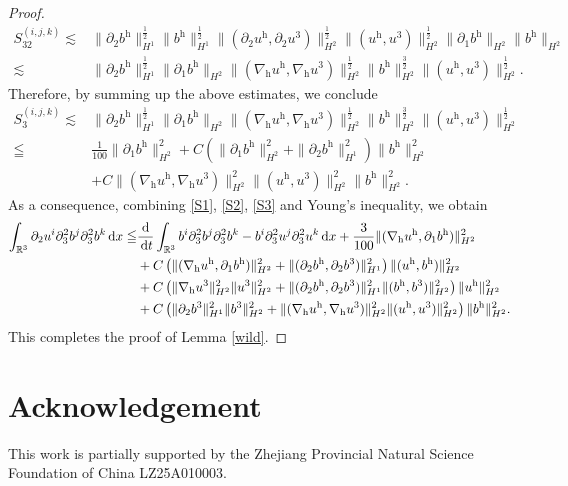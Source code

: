 \documentclass[11pt]{amsart}
\theoremstyle{definition}
\newcommand{\R}{\mathbb{R}}
\newcommand{\h}{\mathrm{h}}
\newcommand{\dx}{\,{\rm d}x}
\newcommand{\dt}{\,{\rm d}t}
\newcommand{\nablah}{\nabla_{\mathrm{h}}}
\numberwithin{equation}{section}
\begin{document}
\begin{proof}
	\begin{align*}
		S^{(i,j,k)}_{32}\lesssim&\|\partial_2b^\h\|_{H^1}^\frac12\|b^\h\|_{H^1}^\frac12\|(\partial_2u^\h,\partial_2u^3)\|_{H^2}^\frac12\|(u^\h,u^3)\|_{H^2}^\frac12\|\partial_1b^\h\|_{H^2}\|b^\h\|_{H^2}\\
		\lesssim&\|\partial_2b^\h\|_{H^1}^\frac12\|\partial_1b^\h\|_{H^2}\|(\nablah u^\h,\nablah u^3)\|_{H^2}^\frac12\|b^\h\|_{H^2}^\frac32\|(u^\h,u^3)\|_{H^2}^\frac12.
	\end{align*}
	Therefore, by summing up the above estimates, we conclude
	\begin{align}\label{S3}
		S^{(i,j,k)}_{3}\lesssim&\|\partial_2b^\h\|_{H^1}^\frac12\|\partial_1b^\h\|_{H^2}\|(\nablah u^\h,\nablah u^3)\|_{H^2}^\frac12\|b^\h\|_{H^2}^\frac32\|(u^\h,u^3)\|_{H^2}^\frac12\nonumber\\
		\leqq &\frac{1}{100}\|\partial_1b^\h\|_{H^2}^2+C\left(\|\partial_1b^\h\|_{H^2}^2+\|\partial_2b^\h\|_{H^1}^2\right)\|b^\h\|_{H^2}^2\nonumber\\
		&+C\|(\nablah u^\h,\nablah u^3)\|_{H^2}^2\|(u^\h,u^3)\|_{H^2}^2\|b^\h\|_{H^2}^2.
	\end{align}
	As a consequence, combining \eqref{S1}, \eqref{S2}, \eqref{S3} and Young's inequality, we obtain
	\begin{align*}
		\int_{\R^3}\partial_2u^i\partial_3^2b^j\partial_3^2b^k\dx \leqq&\frac{\mathrm{d}}{\dt}\int_{\R^3} b^i\partial_3^2b^j\partial_3^2b^k-b^i\partial_3^2u^j\partial_3^2u^k\dx+\frac{3}{100}\|(\nablah u^\h,\partial_1b^\h)\|_{H^2}^2\nonumber\\
		&+C\left(\|(\nablah u^\h,\partial_1b^\h)\|_{H^2}^2+\|(\partial_2b^\h,\partial_2b^3)\|_{H^1}^2\right)\|(u^\h,b^\h)\|_{H^2}^2\nonumber\\
		&+C\left(\|\nablah u^3\|_{H^2}^2\|u^3\|_{H^2}^2+ \|(\partial_2b^\h,\partial_2b^3)\|_{H^1}^2\|(b^\h,b^3)\|_{H^2}^2\right)\|u^\h\|_{H^2}^2\\	&+C\left(\|\partial_2b^3\|_{H^1}^2\|b^3\|_{H^2}^2+\|(\nablah u^\h,\nablah u^3)\|_{H^2}^2\|(u^\h,u^3)\|_{H^2}^2\right)\|b^\h\|_{H^2}^2.
	\end{align*}
	This completes the proof of Lemma \ref{wild}.
\end{proof}

\section*{Acknowledgement}
This work is partially supported by the Zhejiang Provincial Natural Science Foundation of China LZ25A010003.
\end{document}

